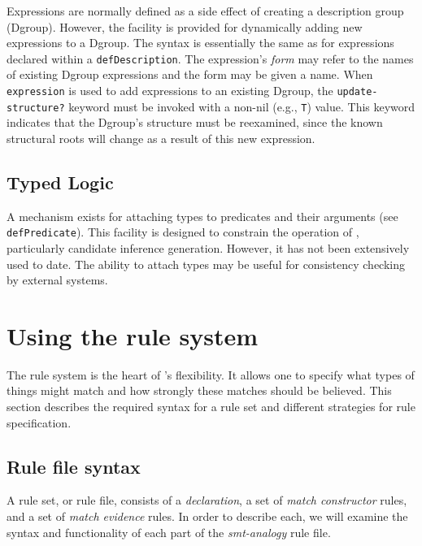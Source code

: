 \indent
{}

Expressions are normally defined as a side effect of creating a description group
(Dgroup). However, the facility is provided for dynamically adding new expressions
to a Dgroup. The syntax is essentially the same as for expressions declared within
a {\tt defDescription}. The expression's {\it form} may refer to the names of
existing Dgroup expressions and the form may be given a name. When {\tt expression} is
used to add expressions to an existing Dgroup, the {\tt update-structure?} keyword
must be invoked with a non-nil (e.g., {\tt T}) value. This keyword indicates
that the Dgroup's structure must be reexamined, since the known structural
roots will change as a result of this new expression.

\subsection{Typed Logic}

A mechanism exists for attaching types to predicates and their arguments
(see {\tt defPredicate}).  This facility is designed to constrain the
operation of \SME, particularly candidate inference generation. However, it
has not been extensively used to date.  The ability to attach types may be
useful for consistency checking by external systems.


\section{Using the rule system}\label{ss:rule-system}

The rule system is the heart of \SME's flexibility. It allows one to specify
what types of things might match and how strongly these matches should be
believed. This section describes the required syntax for a rule set and
different strategies for rule specification.

\subsection{Rule file syntax}

A rule set, or rule file, consists of a {\it declaration}, a set of
{\it match constructor} rules, and a set of {\it match evidence} rules.
In order to describe each, we will examine the syntax and functionality of
each part of the {\it smt-analogy} rule file.

